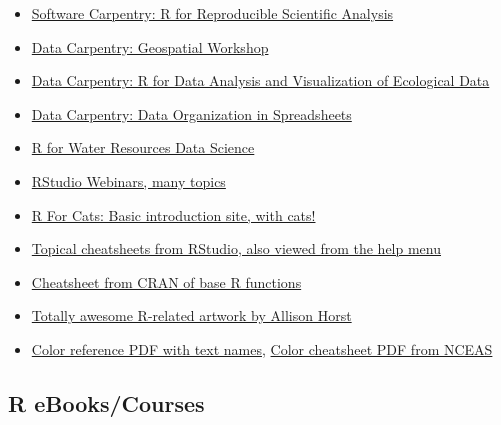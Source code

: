 \documentclass[
  letterpaper,
  DIV=11,
  numbers=noendperiod]{scrreprt}
\providecommand{\tightlist}{%
  \setlength{\itemsep}{0pt}\setlength{\parskip}{0pt}}\usepackage{longtable,booktabs,array}
\begin{document}
\begin{itemize}
\tightlist
\item
  \href{http://data-lessons.github.io/gapminder-R/}{Software Carpentry:
  R for Reproducible Scientific Analysis}
\item
  \href{https://datacarpentry.org/geospatial-workshop/}{Data Carpentry:
  Geospatial Workshop}
\item
  \href{http://www.datacarpentry.org/R-ecology-lesson/}{Data Carpentry:
  R for Data Analysis and Visualization of Ecological Data}
\item
  \href{http://www.datacarpentry.org/spreadsheet-ecology-lesson/}{Data
  Carpentry: Data Organization in Spreadsheets}
\item
  \href{https://www.r4wrds.com/}{R for Water Resources Data Science}
\item
  \href{https://www.rstudio.com/resources/webinars/}{RStudio Webinars,
  many topics}
\item
  \href{http://rforcats.net/}{R For Cats: Basic introduction site, with
  cats!}
\item
  \href{http://www.rstudio.com/resources/cheatsheets/}{Topical
  cheatsheets from RStudio, also viewed from the help menu}
\item
  \href{http://cran.r-project.org/doc/contrib/Short-refcard.pdf}{Cheatsheet
  from CRAN of base R functions}
\item
  \href{https://github.com/allisonhorst/stats-illustrations}{Totally
  awesome R-related artwork by Allison Horst}
\item
  \href{http://www.stat.columbia.edu/~tzheng/files/Rcolor.pdf}{Color
  reference PDF with text names},
  \href{https://www.nceas.ucsb.edu/sites/default/files/2020-04/colorPaletteCheatsheet.pdf}{Color
  cheatsheet PDF from NCEAS}
\end{itemize}

\hypertarget{r-ebookscourses}{%
\subsection*{R eBooks/Courses}\label{r-ebookscourses}}
\end{document}
